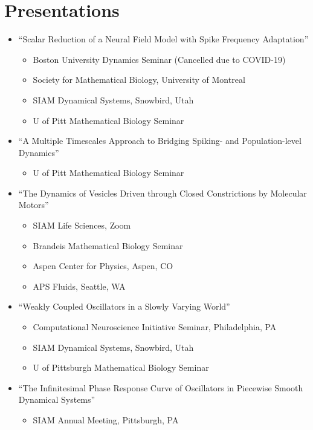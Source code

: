 \documentclass[a4paper,10pt]{article}
\begin{document}
\section{Presentations}
\begin{itemize}[leftmargin=.225in,rightmargin=.1in]
    \item ``Scalar Reduction of a Neural Field Model with Spike Frequency Adaptation''
    \begin{itemize}
        \item { Boston University Dynamics Seminar (Cancelled due to COVID-19)}
        \item { Society for Mathematical Biology, University of Montreal}
        \item { SIAM Dynamical Systems, Snowbird, Utah}
        \item { U of Pitt Mathematical Biology Seminar}
    \end{itemize}
    \item ``A Multiple Timescales Approach to Bridging Spiking- and Population-level Dynamics''
    \begin{itemize}
        \item { U of Pitt Mathematical Biology Seminar}
    \end{itemize}
    \item ``The Dynamics of Vesicles Driven through Closed Constrictions by Molecular Motors''
    \begin{itemize}
        \item { SIAM Life Sciences, Zoom}
        \item { Brandeis Mathematical Biology Seminar}
        \item { Aspen Center for Physics, Aspen, CO}
        \item { APS Fluids, Seattle, WA}
    \end{itemize}
    \item ``Weakly Coupled Oscillators in a Slowly Varying World''
    \begin{itemize}
         \item { Computational Neuroscience Initiative Seminar, Philadelphia, PA}
         \item { SIAM Dynamical Systems, Snowbird, Utah}
         \item { U of Pittsburgh Mathematical Biology Seminar}
    \end{itemize}
    \item  ``The Infinitesimal Phase Response Curve of Oscillators in Piecewise Smooth Dynamical Systems''
    \begin{itemize}
        \item { SIAM Annual Meeting, Pittsburgh, PA}
    \end{itemize}
\end{itemize}
\end{document}
